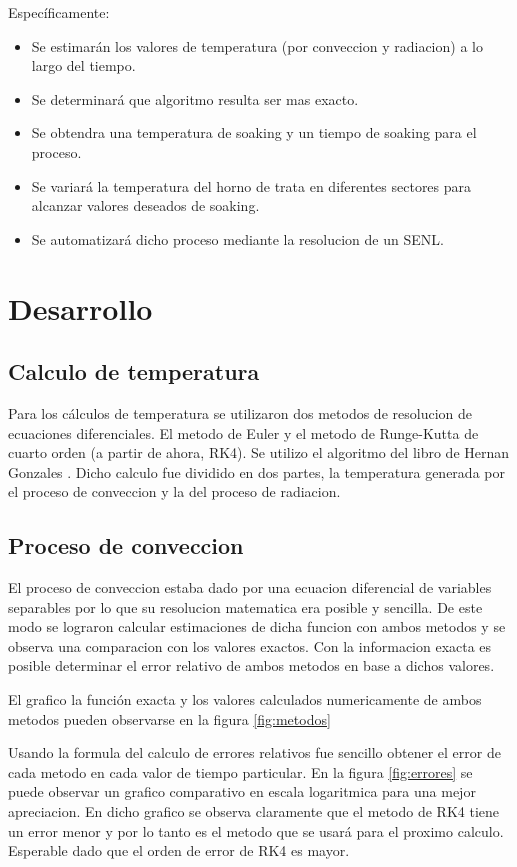\documentclass[11pt,a4paper]{article}
\begin{document}
Específicamente:

\begin{itemize}
\item Se estimarán los valores de temperatura (por conveccion y radiacion) a lo largo del tiempo.
\item Se determinará que algoritmo resulta ser mas exacto.
\item Se obtendra una temperatura de soaking y un tiempo de soaking para el proceso.
\item Se variará la temperatura del horno de trata en diferentes sectores para alcanzar valores deseados de soaking.
\item Se automatizará dicho proceso mediante la resolucion de un SENL.
\end{itemize}

\section{Desarrollo}

\subsection{Calculo de temperatura}

Para los cálculos de temperatura se utilizaron dos metodos de resolucion de ecuaciones diferenciales. El metodo de Euler y el metodo de Runge-Kutta de cuarto orden (a partir de ahora, RK4). Se utilizo el algoritmo del libro de Hernan Gonzales \cite{Gonzales}. Dicho calculo fue dividido en dos partes, la temperatura generada por el proceso de conveccion y la del proceso de radiacion.

\subsection{Proceso de conveccion}

El proceso de conveccion estaba dado por una ecuacion diferencial de variables separables por lo que su resolucion matematica era posible y sencilla. De este modo se lograron calcular estimaciones de dicha funcion con ambos metodos y se observa una comparacion con los valores exactos. Con la informacion exacta es posible determinar el error relativo de ambos metodos en base a dichos valores.

El grafico la función exacta y los valores calculados numericamente de ambos metodos pueden observarse en la figura \ref{fig:metodos}

Usando la formula del calculo de errores relativos fue sencillo obtener el error de cada metodo en cada valor de tiempo particular. En la figura \ref{fig:errores} se puede observar un grafico comparativo en escala logaritmica para una mejor apreciacion. En dicho grafico se observa claramente que el metodo de RK4 tiene un error menor y por lo tanto es el metodo que se usará para el proximo calculo. Esperable dado que el orden de error de RK4 es mayor.
\end{document}

